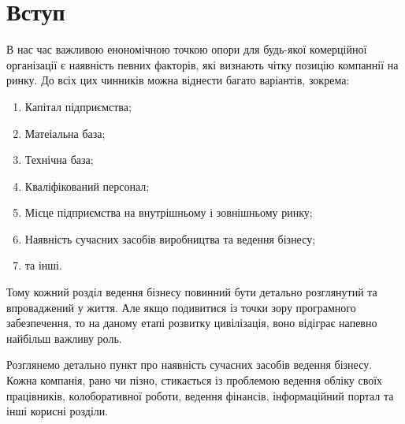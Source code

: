 





\maketitle


\tableofcontents


%


\section{Вступ}
В нас час важливою енономічною точкою опори для будь-якої комерційної організації є наявність певних факторів, які визнають чітку позицію компаннії на ринку. До всіх цих чинників можна віднести багато варіантів, зокрема:
\begin{enumerate}
\item Капітал підприємства;
\item Матеіальна база;
\item Технічна база;
\item Кваліфікований персонал;
\item Місце підприємства на внутрішньому і зовнішньому ринку;
\item Наявність сучасних засобів виробництва та ведення бізнесу;
\item та інші.
\end{enumerate}

Тому кожний розділ ведення бізнесу повинний бути детально розглянутий та впроваджений у життя. Але якщо подивитися із точки зору програмного забезпечення, то на даному етапі розвитку цивілізація, воно відіграє напевно найбільш важливу роль.

Розглянемо детально пункт про наявність сучасних засобів ведення бізнесу. Кожна компанія, рано чи пізно, стикається із проблемою ведення обліку своїх працівників, колоборативної роботи, ведення фінансів, інформаційний портал та інші корисні розділи.






